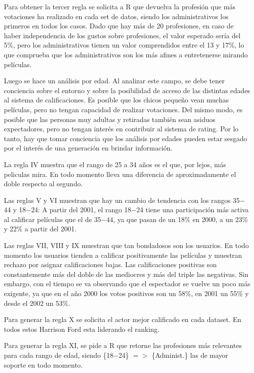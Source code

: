 \documentclass[journal]{IEEEtran}
\begin{document}
Para obtener la tercer regla se solicita a R que devuelva la profesión que más votaciones 
ha realizado en cada set de datos, siendo los administrativos los primeros en todos los casos.
Dado que hay más de 20 profesiones, en caso de haber independencia de los gustos sobre profesiones, 
el valor esperado sería del 5\%, pero los administrativos tienen un valor comprendidos entre el
13 y 17\%, lo que comprueba que los administrativos son los más afines a entretenerse mirando
películas.

Luego se hace un análisis por edad. Al analizar este campo, se debe tener conciencia
sobre el entorno y sobre la posibilidad de acceso de las distintas edades al sistema de calificaciones.
Es posible que los chicos pequeño vean muchas películas, pero no tengan capacidad
de realizar votaciones. Del mismo modo, es posible que las personas muy adultas y
retiradas también sean asiduos expectadores, pero no tengan  interés en contribuir al sistema
de rating. Por lo tanto, hay que tomar conciencia que los análisis por edades pueden estar
sesgado por el interés de una generación en brindar información.

 La regla IV muestra
que el rango de 25 a 34 años es el que, por lejos, más peliculas mira. En todo momento
lleva una diferencia de aproximadamente el doble respecto al segundo.

Las reglas V y VI muestran que hay un cambio de tendencia con los rangos 35$-$44 y
18$-$24: A partir del 2001, el rango 18$-$24 tiene una participación más activa
al calificar películas que el de 35$-$44, ya que pasan de un 18\% en 2000, a
un 23\% y 22\% a partir del 2001.

Las reglas VII, VIII y IX muestran que tan bondadosos son los usuarios. En todo
momento los usuarios tienden a calificar positivamente las películas y muestran
rechazo por asignar calificaciones bajas. Las calificaciones positivas son 
constantemente más del doble de las mediocres y más del triple las negativas.
Sin  embargo, con el tiempo se va observando que el espectador se vuelve un
poco más exigente, ya que en el año 2000 los votos positivos son un 58\%, en
2001 un 55\% y desde el 2002 un 53\%.

Para generar la regla X se solicita el actor mejor calificado en cada dataset.
En todos estos Harrison Ford esta liderando el ranking. 

Para generar la regla XI, se pide a R que retorne las profesiones más relevantes
para cada rango de edad, siendo \{18$-$24\} $=$$>$ \{Administ.\} las de 
mayor soporte en todo momento.
\end{document}
